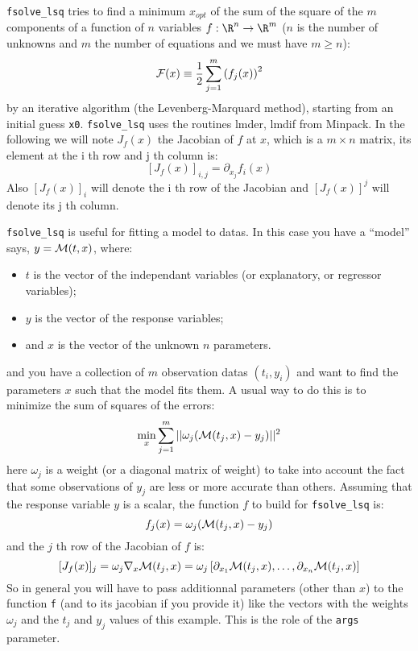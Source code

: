 \begin{mandescription}
\verb+fsolve_lsq+  tries to find a minimum $x_{opt}$ of the sum of the square of the $m$ components of a function
of $n$ variables $f: {\R}^n \rightarrow  {\R}^m$ ($n$ is the number of unknowns and $m$ the number of equations
and we must have $m \ge n$):
$$
    {\cal F}(x) \equiv \frac{1}{2} \sum_{j=1}^m \left(f_j(x)\right)^2
$$
by an iterative algorithm (the Levenberg-Marquard method), starting from an initial guess \verb+x0+.
\verb+fsolve_lsq+ uses the routines lmder, lmdif from Minpack. In the following we will note $J_f(x)$
the Jacobian of $f$ at $x$, which is a $m \times n$ matrix, its element at the i th row and j th column
is:
$$
[J_f(x)]_{i,j} = \partial_{x_j} f_i(x)
$$
Also $[J_f(x)]_i$ will denote the i th row of the Jacobian and  $[J_f(x)]^j$ will denote its j th column. 

\verb+fsolve_lsq+ is useful for fitting a model to datas. In this case you have a ``model'' 
says, $y = {\cal M}(t, x)$, where:
\begin{itemize}
\item $t$ is the vector of the independant variables (or explanatory, or regressor variables);
\item $y$ is the vector of the response variables; 
\item and $x$ is the vector of the unknown $n$ parameters.
\end{itemize}
and you have a collection of $m$ observation datas $(t_i, y_i)$ and want to find the parameters $x$ such 
that the model fits them. A usual way to do this is to minimize the sum of squares of the errors:
$$
   \min_x \sum_{j=1}^m || \omega_j ({\cal M}(t_j, x) - y_j) ||^2
$$
here $\omega_j$ is a weight (or a diagonal matrix of weight) to take into account the fact that some observations
of $y_j$ are less or more accurate than others. Assuming that the response variable $y$ is a scalar, the function $f$
to build for \verb+fsolve_lsq+ is:
$$
  f_j(x) =  \omega_j ({\cal M}(t_j, x) - y_j) 
$$ 
and the $j$ th row of the Jacobian of $f$ is:
$$
  [J_f(x)]_j = \omega_j \nabla_x {\cal M}(t_j, x) =  \omega_j \left[ \partial_{x_1}{\cal M}(t_j, x), \dots,
    \partial_{x_n}{\cal M}(t_j, x) \right]
$$
So in general you will have to pass additionnal parameters (other than $x$) to the 
function \verb+f+ (and to its jacobian if you provide it) like the vectors with the 
weights $\omega_j$ and the $t_j$ and $y_j$ values of this example. This is the 
role of the \verb+args+ parameter. 



\end{mandescription}
